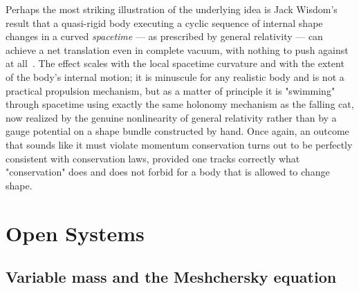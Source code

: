 Perhaps the most striking illustration of the underlying idea is Jack
Wisdom's result that a quasi-rigid body executing a cyclic sequence
of internal shape changes in a curved \emph{spacetime} --- as
prescribed by general relativity --- can achieve a net translation
even in complete vacuum, with nothing to push against at
all~\cite{wisdom}. The effect scales with the local spacetime
curvature and with the extent of the body's internal motion; it is
minuscule for any realistic body and is not a practical propulsion
mechanism, but as a matter of principle it is "swimming" through
spacetime using exactly the same holonomy mechanism as the falling
cat, now realized by the genuine nonlinearity of general relativity
rather than by a gauge potential on a shape bundle constructed by
hand. Once again, an outcome that sounds like it must violate
momentum conservation turns out to be perfectly consistent with
conservation laws, provided one tracks correctly what "conservation"
does and does not forbid for a body that is allowed to change shape.

\chapter{Open Systems}
\label{open}

\section{Variable mass and the Meshchersky equation}

